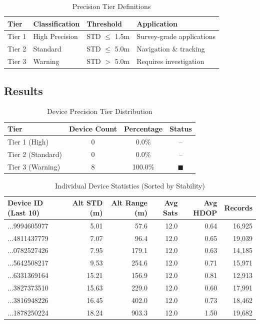 \documentclass[11pt,a4paper]{article}
\begin{document}
\begin{table}[H]
\centering
\caption{Precision Tier Definitions}
\begin{tabular}{llll}
\toprule
\textbf{Tier} & \textbf{Classification} & \textbf{Threshold} & \textbf{Application} \\
\midrule
\textcolor{tier1}{Tier 1} & High Precision & STD $\leq$ 1.5m & Survey-grade applications \\
\textcolor{tier2}{Tier 2} & Standard & STD $\leq$ 5.0m & Navigation \& tracking \\
\textcolor{tier3}{Tier 3} & Warning & STD $>$ 5.0m & Requires investigation \\
\bottomrule
\end{tabular}
\end{table}

\subsection{Results}

\begin{table}[H]
\centering
\caption{Device Precision Tier Distribution}
\begin{tabular}{lccc}
\toprule
\textbf{Tier} & \textbf{Device Count} & \textbf{Percentage} & \textbf{Status} \\
\midrule
Tier 1 (High) & 0 & 0.0\% & -- \\
Tier 2 (Standard) & 0 & 0.0\% & -- \\
\textcolor{tier3}{Tier 3 (Warning)} & 8 & 100.0\% & \textcolor{tier3}{$\blacksquare$} \\
\bottomrule
\end{tabular}
\end{table}

\begin{table}[H]
\centering
\caption{Individual Device Statistics (Sorted by Stability)}
\begin{tabular}{lrrrrr}
\toprule
\textbf{Device ID (Last 10)} & \textbf{Alt STD (m)} & \textbf{Alt Range (m)} & \textbf{Avg Sats} & \textbf{Avg HDOP} & \textbf{Records} \\
\midrule
...9994605977 & 5.01 & 57.6 & 12.0 & 0.64 & 16,925 \\
...4811437779 & 7.07 & 96.4 & 12.0 & 0.65 & 19,039 \\
...0782527426 & 7.95 & 179.1 & 12.0 & 0.63 & 14,185 \\
...5642508217 & 9.53 & 254.6 & 12.0 & 0.71 & 15,971 \\
...6331369164 & 15.21 & 156.9 & 12.0 & 0.81 & 12,913 \\
...3827373510 & 15.63 & 229.0 & 12.0 & 0.60 & 17,991 \\
...3816948226 & 16.45 & 402.0 & 12.0 & 0.73 & 18,462 \\
\textcolor{tier3}{...1878250224} & \textcolor{tier3}{18.24} & \textcolor{tier3}{903.3} & 12.0 & 1.50 & 19,682 \\
\bottomrule
\end{tabular}
\end{table}
\end{document}
